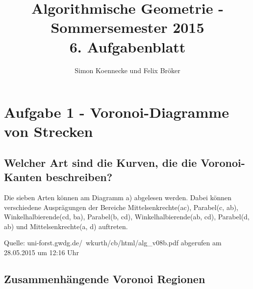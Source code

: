 \documentclass[a4paper]{article}
\begin{document}
\title{Algorithmische Geometrie - Sommersemester 2015\\
       6. Aufgabenblatt }
\author{Simon Koennecke und Felix Bröker}
\date{}
\maketitle

\section*{Aufgabe 1 - Voronoi-Diagramme von Strecken}

\subsection*{Welcher Art sind die Kurven, die die Voronoi-Kanten beschreiben?}

Die sieben Arten können am Diagramm a) abgelesen werden. Dabei können verschiedene Ausprägungen der  Bereiche Mittelsenkrechte(ac), Parabel(c, ab), Winkelhalbierende(cd, ba), Parabel(b, cd), Winkelhalbierende(ab, cd), Parabel(d, ab) und Mittelsenkrechte(a, d) auftreten.
\begin{figure} [!htb] 
\end{figure} 
Quelle: uni-forst.gwdg.de/~wkurth/cb/html/alg\_v08b.pdf abgerufen am 28.05.2015 um 12:16 Uhr

\subsection*{Zusammenhängende Voronoi Regionen}
\end{document}
